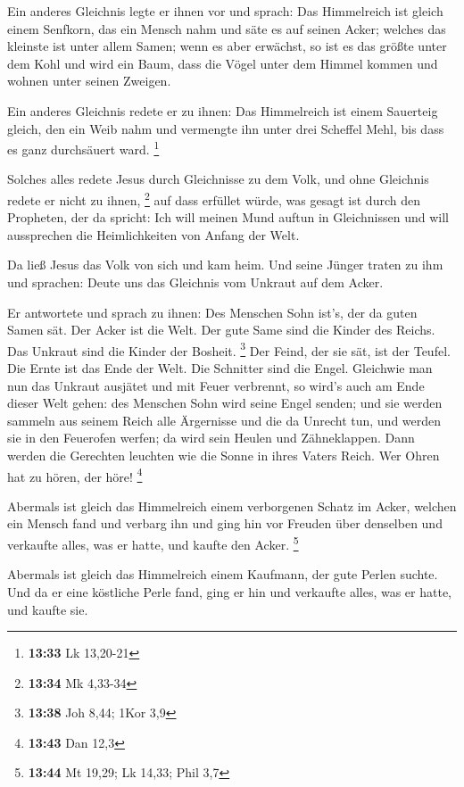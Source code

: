 Ein anderes Gleichnis legte er ihnen vor und sprach: Das
Himmelreich ist gleich einem Senfkorn, das ein Mensch nahm und säte es
auf seinen Acker;  welches das kleinste ist unter allem
Samen; wenn es aber erwächst, so ist es das größte unter dem Kohl und
wird ein Baum, dass die Vögel unter dem Himmel kommen und wohnen unter
seinen Zweigen.

 Ein anderes Gleichnis redete er zu ihnen: Das Himmelreich
ist einem Sauerteig gleich, den ein Weib nahm und vermengte ihn unter
drei Scheffel Mehl, bis dass es ganz durchsäuert ward. \footnote{\textbf{13:33}
  Lk 13,20-21}

 Solches alles redete Jesus durch Gleichnisse zu dem Volk,
und ohne Gleichnis redete er nicht zu ihnen, \footnote{\textbf{13:34} Mk
  4,33-34}  auf dass erfüllet würde, was gesagt ist durch
den Propheten, der da spricht: Ich will meinen Mund auftun in
Gleichnissen und will aussprechen die Heimlichkeiten von Anfang der
Welt.

 Da ließ Jesus das Volk von sich und kam heim. Und seine
Jünger traten zu ihm und sprachen: Deute uns das Gleichnis vom Unkraut
auf dem Acker.

 Er antwortete und sprach zu ihnen: Des Menschen Sohn
ist's, der da guten Samen sät.  Der Acker ist die Welt. Der
gute Same sind die Kinder des Reichs. Das Unkraut sind die Kinder der
Bosheit. \footnote{\textbf{13:38} Joh 8,44; 1Kor 3,9}  Der
Feind, der sie sät, ist der Teufel. Die Ernte ist das Ende der Welt. Die
Schnitter sind die Engel.  Gleichwie man nun das Unkraut
ausjätet und mit Feuer verbrennt, so wird's auch am Ende dieser Welt
gehen:  des Menschen Sohn wird seine Engel senden; und sie
werden sammeln aus seinem Reich alle Ärgernisse und die da Unrecht tun,
 und werden sie in den Feuerofen werfen; da wird sein
Heulen und Zähneklappen.  Dann werden die Gerechten
leuchten wie die Sonne in ihres Vaters Reich. Wer Ohren hat zu hören,
der höre! \footnote{\textbf{13:43} Dan 12,3}

 Abermals ist gleich das Himmelreich einem verborgenen
Schatz im Acker, welchen ein Mensch fand und verbarg ihn und ging hin
vor Freuden über denselben und verkaufte alles, was er hatte, und kaufte
den Acker. \footnote{\textbf{13:44} Mt 19,29; Lk 14,33; Phil 3,7}

 Abermals ist gleich das Himmelreich einem Kaufmann, der
gute Perlen suchte.  Und da er eine köstliche Perle fand,
ging er hin und verkaufte alles, was er hatte, und kaufte sie.


